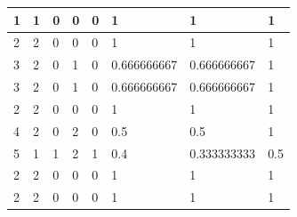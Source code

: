 \begin{small}
\begin{longtable}{|l|l|l|l|l|l|l|l|}
1  & 1                                & 0                                & 0                                & 0                                & 1                                      & 1                                       & 1                                    \\ \hline
2  & 2                                & 0                                & 0                                & 0                                & 1                                      & 1                                       & 1                                    \\ \hline
3  & 2                                & 0                                & 1                                & 0                                & 0.666666667                            & 0.666666667                             & 1                                    \\ \hline
3  & 2                                & 0                                & 1                                & 0                                & 0.666666667                            & 0.666666667                             & 1                                    \\ \hline
2  & 2                                & 0                                & 0                                & 0                                & 1                                      & 1                                       & 1                                    \\ \hline
4  & 2                                & 0                                & 2                                & 0                                & 0.5                                    & 0.5                                     & 1                                    \\ \hline
5  & 1                                & 1                                & 2                                & 1                                & 0.4                                    & 0.333333333                             & 0.5                                  \\ \hline
2  & 2                                & 0                                & 0                                & 0                                & 1                                      & 1                                       & 1                                    \\ \hline
2  & 2                                & 0                                & 0                                & 0                                & 1                                      & 1                                       & 1                                    \\ \hline

\end{longtable}
\end{small}
